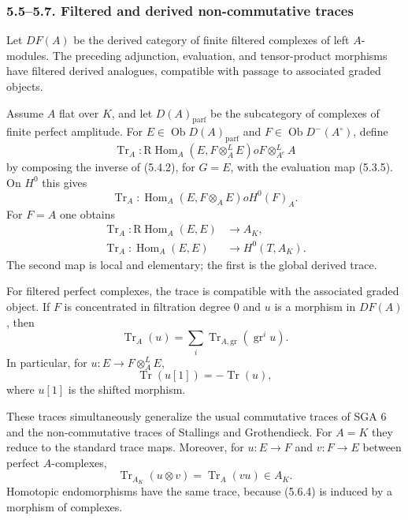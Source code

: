 \documentclass[11pt]{article}
\theoremstyle{plain}
\theoremstyle{definition}
\theoremstyle{remark}
\DeclareMathOperator{\Hom}{Hom}
\DeclareMathOperator{\ob}{Ob}
\DeclareMathOperator{\Tr}{Tr}
\newcommand{\R}{\mathrm R}
\begin{document}
\subsubsection*{5.5--5.7. Filtered and derived non-commutative traces}
Let $DF(A)$ be the derived category of finite filtered complexes of left $A$-modules. The preceding adjunction, evaluation, and tensor-product morphisms have filtered derived analogues, compatible with passage to associated graded objects.

Assume $A$ flat over $K$, and let $D(A)_{\mathrm{parf}}$ be the subcategory of complexes of finite perfect amplitude. For $E\in\ob D(A)_{\mathrm{parf}}$ and $F\in\ob D^{-}(A^{\circ})$, define
\begin{equation}
   \Tr_A:\R\Hom_A(E,F\otimes_A^LE)	o F\otimes_{A^e}^LA             \tag{5.6.1}
\end{equation}
by composing the inverse of (5.4.2), for $G=E$, with the evaluation map (5.3.5). On $H^0$ this gives
\begin{equation}
   \Tr_A:\Hom_A(E,F\otimes_AE)	o H^0(F)_A.                       \tag{5.6.2}
\end{equation}
For $F=A$ one obtains
\begin{align}
   \Tr_A:\R\Hom_A(E,E)&\to A_K,                                   \tag{5.6.3}\\
   \Tr_A:\Hom_A(E,E)&\to H^0(T,A_K).                              \tag{5.6.4}
\end{align}
The second map is local and elementary; the first is the global derived trace.

For filtered perfect complexes, the trace is compatible with the associated graded object. If $F$ is concentrated in filtration degree $0$ and $u$ is a morphism in $DF(A)$, then
\begin{equation}
   \Tr_A(u)=\sum_i\Tr_{A,\mathrm{gr}}(\operatorname{gr}^iu).        \tag{5.6.5}
\end{equation}
In particular, for $u:E\to F\otimes_A^LE$,
\begin{equation}
   \Tr(u[1])=-\Tr(u),                                              \tag{5.6.6}
\end{equation}
where $u[1]$ is the shifted morphism.

These traces simultaneously generalize the usual commutative traces of SGA 6 and the non-commutative traces of Stallings and Grothendieck. For $A=K$ they reduce to the standard trace maps. Moreover, for $u:E\to F$ and $v:F\to E$ between perfect $A$-complexes,
\begin{equation}
   \Tr_{A_K}(u\otimes v)=\Tr_A(vu)\in A_K.                         \tag{5.7.1}
\end{equation}
Homotopic endomorphisms have the same trace, because (5.6.4) is induced by a morphism of complexes.
\end{document}
